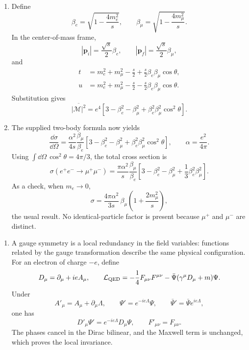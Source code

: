 \begin{enumerate}
\begin{enumerate}
\item
Define
\[
 \beta_e=\sqrt{1-\frac{4m_e^2}{s}},\qquad
 \beta_\mu=\sqrt{1-\frac{4m_\mu^2}{s}}.
\]
In the center-of-mass frame,
\[
 |\mathbf p_i|=\frac{\sqrt s}{2}\beta_e,\qquad
 |\mathbf p_f|=\frac{\sqrt s}{2}\beta_\mu,
\]
and
\[
 \begin{split}
 t&=m_e^2+m_\mu^2-\frac{s}{2}
 +\frac{s}{2}\beta_e\beta_\mu\cos\theta,\\
 u&=m_e^2+m_\mu^2-\frac{s}{2}
 -\frac{s}{2}\beta_e\beta_\mu\cos\theta.
 \end{split}
\]
Substitution gives
\[
 \boxed{
 \overline{|\mathcal M|^2}
 =e^4\left[
 3-\beta_e^2-\beta_\mu^2
 +\beta_e^2\beta_\mu^2\cos^2\theta
 \right].}
\]

\item
The supplied two-body formula now yields
\[
 \boxed{
 \frac{\dd\sigma}{\dd\Omega}
 =\frac{\alpha^2}{4s}\frac{\beta_\mu}{\beta_e}
 \left[
 3-\beta_e^2-\beta_\mu^2
 +\beta_e^2\beta_\mu^2\cos^2\theta
 \right],}
\qquad \alpha=\frac{e^2}{4\pi}.
\]
Using \(\int \dd\Omega\,\cos^2\theta=4\pi/3\), the total cross section is
\[
 \boxed{
 \sigma(e^+e^-\to\mu^+\mu^-)
 =\frac{\pi\alpha^2}{s}\frac{\beta_\mu}{\beta_e}
 \left[
 3-\beta_e^2-\beta_\mu^2
 +\frac13\beta_e^2\beta_\mu^2
 \right].}
\]
As a check, when \(m_e\to0\),
\[
 \sigma
 =\frac{4\pi\alpha^2}{3s}\,
 \beta_\mu\left(1+\frac{2m_\mu^2}{s}\right),
\]
the usual result.  No identical-particle factor is present because
\(\mu^+\) and \(\mu^-\) are distinct.
\end{enumerate}

\begin{enumerate}
\item
A gauge symmetry is a local redundancy in the field variables: functions
related by the gauge transformation describe the same physical
configuration.  For an electron of charge \(-e\), define
\[
 D_\mu=\partial_\mu+ieA_\mu,\qquad
 \mathcal L_{\rm QED}
 =-\frac14F_{\mu\nu}F^{\mu\nu}
 -\bar\Psi(\gamma^\mu D_\mu+m)\Psi .
\]
Under
\[
 A'_\mu=A_\mu+\partial_\mu\Lambda,\qquad
 \Psi'=e^{-ie\Lambda}\Psi,\qquad
 \bar\Psi'=\bar\Psi e^{ie\Lambda},
\]
one has
\[
 D'_\mu\Psi'=e^{-ie\Lambda}D_\mu\Psi,
 \qquad F'_{\mu\nu}=F_{\mu\nu}.
\]
The phases cancel in the Dirac bilinear, and the Maxwell term is unchanged,
which proves the local invariance.


\end{enumerate}
\end{enumerate}
